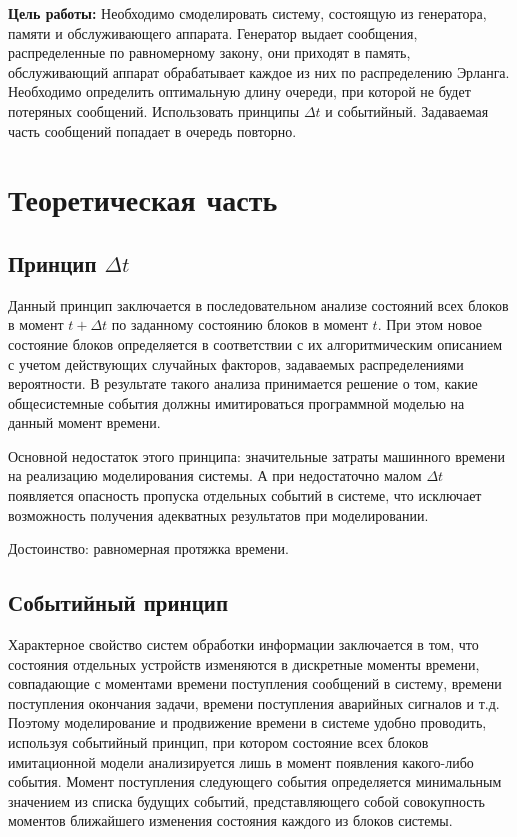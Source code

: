 \documentclass[a4paper, 14pt]{article}
\begin{document}
	\textbf{Цель работы:} Необходимо смоделировать систему, состоящую из генератора, памяти и обслуживающего аппарата. 
	Генератор выдает сообщения, распределенные по равномерному закону, они приходят в память, обслуживающий аппарат обрабатывает каждое из них по распределению Эрланга. Необходимо определить оптимальную длину очереди, при которой не будет потеряных сообщений. Использовать принципы $\Delta t$ и событийный. Задаваемая часть сообщений попадает в очередь повторно.
	
	
	\section*{Теоретическая часть}
	\subsection*{Принцип $\Delta t$}
	
Данный принцип заключается в последовательном анализе состояний всех блоков в момент $t + \Delta t$ по заданному состоянию блоков в момент $t$. При этом новое состояние блоков определяется в соответствии с их алгоритмическим описанием с учетом действующих случайных факторов, задаваемых распределениями вероятности. В результате такого анализа принимается решение о том, какие общесистемные события должны имитироваться программной моделью на данный момент времени.

Основной недостаток этого принципа: значительные затраты машинного времени на реализацию моделирования системы. А при недостаточно малом $\Delta t$ появляется опасность пропуска отдельных событий в системе, что исключает возможность получения адекватных результатов при моделировании.

Достоинство: равномерная протяжка времени.

\subsection*{Событийный принцип}

Характерное свойство систем обработки информации заключается в том, что состояния отдельных устройств изменяются в дискретные моменты времени, совпадающие с моментами времени поступления сообщений в систему, времени поступления окончания задачи, времени поступления аварийных сигналов и т.д. Поэтому моделирование и продвижение времени в системе удобно проводить, используя событийный принцип, при котором состояние всех блоков имитационной модели анализируется лишь в момент появления какого-либо события. Момент поступления следующего события определяется минимальным значением из списка будущих событий, представляющего собой совокупность моментов ближайшего изменения состояния каждого из блоков системы.
\end{document}
